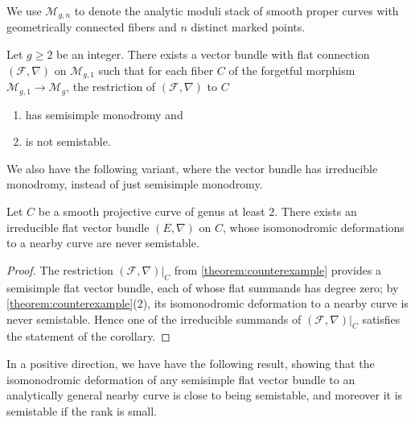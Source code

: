 We use
$\mathscr{M}_{g,n}$ to denote the analytic moduli stack of smooth proper curves with
geometrically connected fibers and $n$ distinct marked points.
\begin{theorem}
\notready
	\label{theorem:counterexample}
Let $g\geq 2$ be an integer. There exists a vector bundle with flat connection
$(\mathscr{F}, \nabla)$ on $\mathscr{M}_{g,1}$ such that for each fiber $C$ of
the forgetful morphism $\mathscr{M}_{g,1} \to \mathscr{M}_g$, the restriction of $(\mathscr{F}, \nabla)$ to $C$
\begin{enumerate}
    \item has semisimple monodromy and
    \item is not semistable.
\end{enumerate}
\end{theorem}
%

We also have the following variant, where the vector bundle has irreducible
monodromy, instead of just semisimple monodromy.
\begin{corollary}
\notready\label{corollary:counterexample}
Let $C$ be a smooth projective curve of genus at least $2$. There exists an irreducible flat
vector bundle $(E, \nabla)$ on $C$, whose isomonodromic deformations to
a nearby curve are never semistable.
\end{corollary}
\begin{proof}
	The restriction $(\mathscr{F}, \nabla)|_C$ from \autoref{theorem:counterexample} provides a semisimple flat vector bundle, each of whose flat summands has degree zero; by \autoref{theorem:counterexample}(2), its
isomonodromic deformation to a nearby curve is never semistable. Hence one of
the irreducible summands of
$(\mathscr{F}, \nabla)|_C$
satisfies the statement of the corollary.
\end{proof}

In a positive direction, we have have the following result, showing
that the
isomonodromic deformation of any semisimple flat vector bundle to an
analytically general nearby curve is close to being semistable, and moreover it is
semistable if the rank is small.

